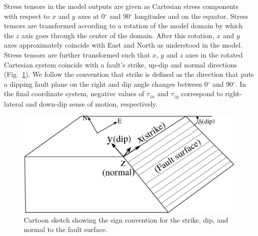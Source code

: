 \documentclass[draft,linenumbers]{agujournal2018}
\begin{document}
Stress tensors in the model outputs are given as Cartesian stress components with respect to $x$ and $y$ axes at 0$^{\circ}$ and 90$^{\circ}$ longitudes and on the equator. Stress tensors are transformed according to a rotation of the model domain by which the $z$ axis goes through the center of the domain. After this rotation, $x$ and $y$ axes approximately coincide with East and North as understood in the model. Stress tensors are further transformed such that $x$, $y$ and $z$ axes in the rotated Cartesian system coincide with a fault\rq{}s strike, up-dip and normal directions (Fig.~\ref{signs}). We follow the convention that strike is defined as the direction that puts a dipping fault plane on the right and dip angle changes between 0$^{\circ}$ and 90$^{\circ}$. %
In the final coordinate system, negative values of $\tau_{zx}$ and $\tau_{zy}$ correspond to right-lateral and down-dip sense of motion, respectively.
%
\begin{figure}[h!]
    \centering
    \includegraphics[width=0.5\linewidth]{figures/sign_convention.png}
    \caption{Cartoon sketch showing the sign convention for the strike, dip, and normal to the fault surface. }
    \label{signs}
\end{figure}
\end{document}
